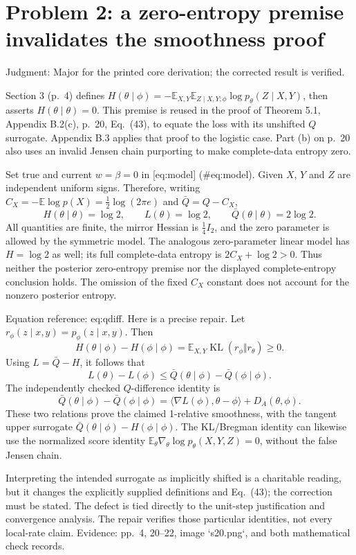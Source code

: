 \documentclass[10pt]{article}
\begin{document}
\section*{Problem 2: a zero-entropy premise invalidates the smoothness proof}
Judgment: Major for the printed core derivation; the corrected result is verified.\par
Section 3 (p. 4) defines \(H(\theta\mid\phi)=-\mathbb E_{X,Y}\mathbb E_{Z\mid X,Y;\phi}\log p_\theta(Z\mid X,Y)\), then asserts \(H(\theta\mid\theta)=0\). This premise is reused in the proof of Theorem 5.1, Appendix B.2(c), p. 20, Eq. (43), to equate the loss with its unshifted \(Q\) surrogate. Appendix B.3 applies that proof to the logistic case. Part (b) on p. 20 also uses an invalid Jensen chain purporting to make complete-data entropy zero.\par
Set true and current \(w=\beta=0\) in [eq:model] (\#eq:model). Given \(X\), \(Y\) and \(Z\) are independent uniform signs. Therefore, writing \(C_X=-\mathbb E\log p(X)=\tfrac12\log(2\pi e)\) and \(\bar Q=Q-C_X\), \[H(\theta\mid\theta)=\log2,\qquad
 L(\theta)=\log2,\qquad
 \bar Q(\theta\mid\theta)=2\log2 .\] All quantities are finite, the mirror Hessian is \(\tfrac14 I_2\), and the zero parameter is allowed by the symmetric model. The analogous zero-parameter linear model has \(H=\log2\) as well; its full complete-data entropy is \(2C_X+\log2>0\). Thus neither the posterior zero-entropy premise nor the displayed complete-entropy conclusion holds. The omission of the fixed \(C_X\) constant does not account for the nonzero posterior entropy.\par
Equation reference: eq:qdiff. Here is a precise repair. Let \(r_\phi(z\mid x,y)=p_\phi(z\mid x,y)\). Then \[H(\theta\mid\phi)-H(\phi\mid\phi)
 =\mathbb E_{X,Y}\operatorname{KL}(r_\phi\Vert r_\theta)\ge0 .\] Using \(L=\bar Q-H\), it follows that \[L(\theta)-L(\phi)\le \bar Q(\theta\mid\phi)-\bar Q(\phi\mid\phi).\] The independently checked \(Q\)-difference identity is \[\bar Q(\theta\mid\phi)-\bar Q(\phi\mid\phi)
 =\langle\nabla L(\phi),\theta-\phi\rangle+D_A(\theta,\phi).
 \] These two relations prove the claimed 1-relative smoothness, with the tangent upper surrogate \(\bar Q(\theta\mid\phi)-H(\phi\mid\phi)\). The KL/Bregman identity can likewise use the normalized score identity \(\mathbb E_\theta\nabla_\theta\log p_\theta(X,Y,Z)=0\), without the false Jensen chain.\par
Interpreting the intended surrogate as implicitly shifted is a charitable reading, but it changes the explicitly supplied definitions and Eq. (43); the correction must be stated. The defect is tied directly to the unit-step justification and convergence analysis. The repair verifies those particular identities, not every local-rate claim. Evidence: pp. 4, 20–22, image `s20.png`, and both mathematical check records.\par
\end{document}
